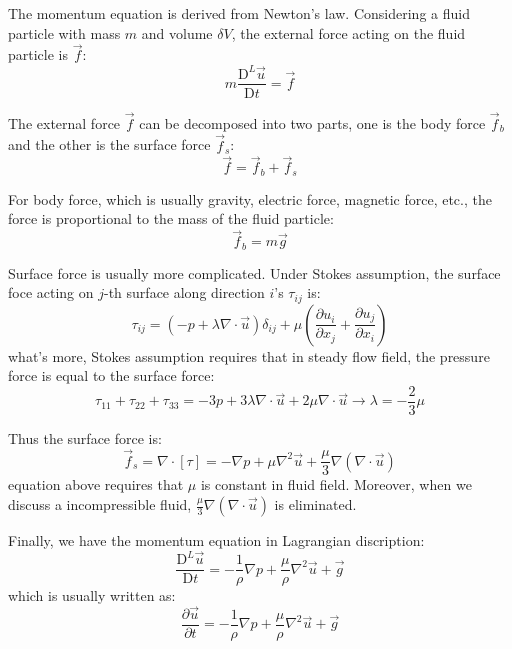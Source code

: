 The momentum equation is derived from Newton's law.
Considering a fluid particle with mass $m$ and volume $\delta V$,
the external force acting on the fluid particle is $\vec{f}$:
\begin{equation}
    m\frac{\mathrm{D}^L \vec{u}}{\mathrm{D} t} = \vec{f}
\end{equation}

The external force $\vec{f}$ can be decomposed into two parts, 
one is the body force $\vec{f}_b$ and the other is the surface force $\vec{f}_s$:
\begin{equation}
    \vec{f} = \vec{f}_b + \vec{f}_s
\end{equation}

For body force, which is usually gravity, electric force, magnetic force, etc., 
the force is proportional to the mass of the fluid particle:
\begin{equation}
    \vec{f}_b = m \vec{g}
\end{equation}

Surface force is usually more complicated. 
Under Stokes assumption, 
the surface foce acting on $j$-th surface along direction $i$'s $\tau_{ij}$ is:
\begin{equation}
    \tau_{ij} = (-p + \lambda\nabla\cdot\vec{u})\delta_{ij} 
    + \mu\left(\frac{\partial u_i}{\partial x_j} + \frac{\partial u_j}{\partial x_i}\right)
\end{equation}
what's more, Stokes assumption requires that in steady flow field, 
the pressure force is equal to the surface force:
\begin{equation}
    \tau_{11}+\tau_{22}+\tau_{33} = -3p 
    + 3\lambda\nabla\cdot\vec{u} 
    + 2\mu \nabla \cdot \vec{u}
    \to
    \lambda = -\frac{2}{3}\mu
\end{equation}

Thus the surface force is:
\begin{equation}
    \vec{f}_s = \nabla\cdot [\tau]
    = 
    -\nabla p + \mu \nabla^2 \vec{u} + \frac{\mu}{3}\nabla(\nabla\cdot\vec{u})
\end{equation}
equation above requires that $\mu$ is constant in fluid field. 
Moreover, when we discuss a incompressible fluid, 
$\frac{\mu}{3}\nabla(\nabla\cdot\vec{u})$ is eliminated.

Finally, we have the momentum equation in Lagrangian discription:
\begin{equation}
    \frac{\mathrm{D}^L \vec{u}}{\mathrm{D} t} = - \frac{1}{\rho}\nabla p + \frac{\mu}{\rho}\nabla^2\vec{u} + \vec{g}
\end{equation}
which is usually written as:
\begin{equation}
    \frac{\partial \vec{u}}{\partial t} = - \frac{1}{\rho}\nabla p + \frac{\mu}{\rho}\nabla^2\vec{u} + \vec{g}
\end{equation}


